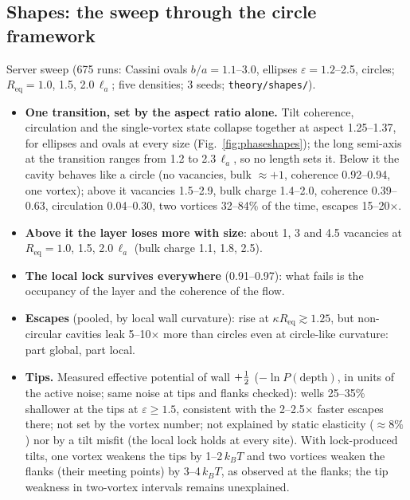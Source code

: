 \subsection{Shapes: the sweep through the circle framework}\label{sec:shapesweep}
Server sweep (675 runs: Cassini ovals $b/a=1.1$--3.0, ellipses $\varepsilon=1.2$--2.5, circles; $R_\mathrm{eq}=1.0$, 1.5, 2.0\,$\ell_a$; five densities; 3 seeds;
\texttt{theory/shapes/}).
\begin{itemize}
  \item \textbf{One transition, set by the aspect ratio alone.} Tilt coherence, circulation and the single-vortex state collapse together at aspect 1.25--1.37, for ellipses and
        ovals at every size (Fig.~\ref{fig:phaseshapes}); the long semi-axis at the transition ranges from 1.2 to 2.3\,$\ell_a$, so no length sets it. Below it the cavity behaves
        like a circle (no vacancies, bulk $\approx+1$, coherence 0.92--0.94, one vortex); above it vacancies 1.5--2.9, bulk charge 1.4--2.0, coherence 0.39--0.63, circulation
        0.04--0.30, two vortices 32--84\% of the time, escapes 15--20$\times$.
  \item \textbf{Above it the layer loses more with size}: about 1, 3 and 4.5 vacancies at $R_\mathrm{eq}=1.0$, 1.5, 2.0\,$\ell_a$ (bulk charge 1.1, 1.8, 2.5).
  \item \textbf{The local lock survives everywhere} (0.91--0.97): what fails is the occupancy of the layer and the coherence of the flow.
  \item \textbf{Escapes} (pooled, by local wall curvature): rise at $\kappa R_\mathrm{eq}\gtrsim1.25$, but non-circular cavities leak 5--10$\times$ more than circles even at
        circle-like curvature: part global, part local.
  \item \textbf{Tips.} Measured effective potential of wall $+\tfrac12$ ($-\ln P(\text{depth})$, in units of the active noise; same noise at tips and flanks checked): wells
        25--35\% shallower at the tips at $\varepsilon\ge1.5$, consistent with the 2--2.5$\times$ faster escapes there; not set by the vortex number; not explained by static
        elasticity ($\approx8\%$) nor by a tilt misfit (the local lock holds at every site). With lock-produced tilts, one vortex weakens the tips by 1--2\,$k_BT$ and two vortices
        weaken the flanks (their meeting points) by 3--4\,$k_BT$, as observed at the flanks; the tip weakness in two-vortex intervals remains unexplained.
\end{itemize}
